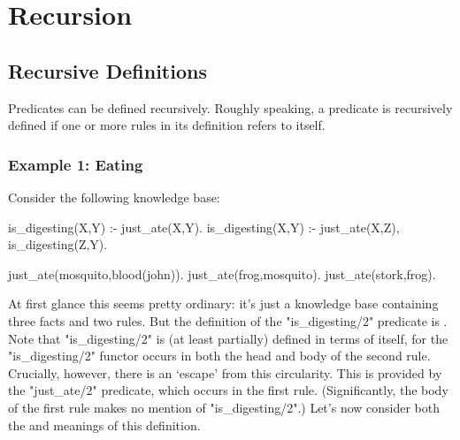 
\chapter{Recursion}\label{CHAPTER3}


\section{Recursive Definitions}\label{SEC.L3.RECURSIVE.DEFINITION}



Predicates can be defined recursively.  Roughly speaking, a predicate
is recursively defined if one or more rules in its definition refers
to itself.

\subsection*{Example 1: Eating}\label{SUBSEC.L3.EX1}



Consider the following knowledge base:
\begin{LPNcodedisplay}
is_digesting(X,Y) :- just_ate(X,Y).
is_digesting(X,Y) :-
        just_ate(X,Z),
        is_digesting(Z,Y).

just_ate(mosquito,blood(john)).
just_ate(frog,mosquito).
just_ate(stork,frog).
\end{LPNcodedisplay}


At first glance this seems pretty ordinary: it's just a knowledge base
containing three facts and two rules.  But the definition of the
"is\_digesting/2" predicate is .  Note that
"is\_digesting/2" is (at least partially) defined in terms of itself,
for the "is\_digesting/2" functor occurs in both the head and body of
the second rule.  Crucially, however, there is an `escape' from this
circularity.  This is provided by the "just\_ate/2" predicate, which
occurs in the first rule.  (Significantly, the body of the first rule
makes no mention of "is\_digesting/2".)  Let's now consider both the
 and  meanings of this definition.

